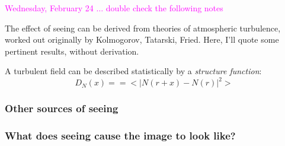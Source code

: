 \documentclass[12pt]{article}
\begin{document}
\textcolor{magenta}{Wednesday, February 24
$\ldots$ double check the following notes}

The effect of seeing can be derived from theories of atmospheric
turbulence, worked out originally by Kolmogorov, Tatarski, Fried.
Here, I'll quote some pertinent results, without derivation.

 A turbulent field can be described statistically by a \emph{structure
 function}:
    $$ D_N(x) = = <|N(r+x)-N(r)|^2>  $$

\subsubsection*{Other sources of seeing}

\subsubsection*{What does seeing cause the image to look like?}
\end{document}
